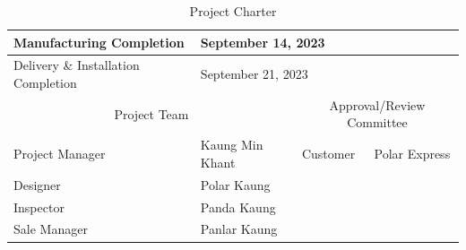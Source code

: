 \begin{table}[!h]
{\begin{tabular}{|llll|}
            \multicolumn{1}{|l|}{Manufacturing Completion}                                & \multicolumn{3}{l|}{September 14, 2023}                                                                                                                                                                   \\ \hline
            \multicolumn{1}{|l|}{Delivery \& Installation Completion}                     & \multicolumn{3}{l|}{September 21, 2023}                                                                                                                                                                   \\ \hline
            \multicolumn{2}{|c|}{\cellcolor[HTML]{96FFFB}Project Team}                    & \multicolumn{2}{c|}{\cellcolor[HTML]{96FFFB}Approval/Review Committee}                                                                                                                                    \\ \hline
            \multicolumn{1}{|l|}{Project Manager}                                         & \multicolumn{1}{l|}{Kaung Min Khant}                                                             & \multicolumn{1}{l|}{Customer}                                & Polar Express                           \\ \hline
            \multicolumn{1}{|l|}{Designer}                                                & \multicolumn{1}{l|}{Polar Kaung}                                                                 & \multicolumn{1}{l|}{}                                        &                                         \\ \hline
            \multicolumn{1}{|l|}{Inspector}                                               & \multicolumn{1}{l|}{Panda Kaung}                                                                 & \multicolumn{1}{l|}{}                                        &                                         \\ \hline
            \multicolumn{1}{|l|}{Sale Manager}                                            & \multicolumn{1}{l|}{Panlar Kaung}                                                                & \multicolumn{1}{l|}{}                                        &                                         \\ \hline
        \end{tabular}
    }
    \caption{Project Charter}
    \label{table:project_charter}
\end{table}
\newpage
